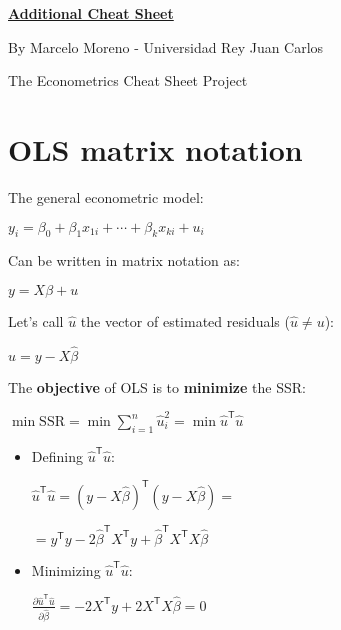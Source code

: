 \documentclass[10pt, a4paper, landscape]{extarticle}
\newcommand{\SSR}{\mathrm{SSR}}
\newcommand{\tr}{\mathsf{T}}
\begin{document}
\setlength{\footskip}{12pt}

\begin{multicols}{3}

\begin{center}
	\textbf{\LARGE \href{https://github.com/marcelomijas/econometrics-cheatsheet}{Additional Cheat Sheet}}
	
	{\footnotesize By Marcelo Moreno - Universidad Rey Juan Carlos}
	
	{\footnotesize The Econometrics Cheat Sheet Project}
\end{center}

\section*{OLS matrix notation}

The general econometric model:

\begin{center}
	$y_i = \beta_0 + \beta_1 x_{1i} + \cdots + \beta_k x_{ki} + u_i$
\end{center}

Can be written in matrix notation as:

\begin{center}
	$y = X \beta + u$
\end{center}

Let's call $\hat{u}$ the vector of estimated residuals ($\hat{u} \neq u$):

\begin{center}
	$\hat{u} = y - X \hat{\beta}$
\end{center}

The \textbf{objective} of OLS is to \textbf{minimize} the SSR:

\begin{center}
	$\min \SSR = \min \sum_{i=1}^n \hat{u}_i^2 = \min \hat{u}^\tr \hat{u}$
\end{center}

\begin{itemize}[leftmargin=*]
	\item Defining $\hat{u}^\tr \hat{u}$:
	\begin{center}
		$\hat{u}^\tr \hat{u} = (y - X \hat{\beta})^\tr (y - X \hat{\beta}) =$

		$= y^\tr y -2 \hat{\beta}^\tr X^\tr y + \hat{\beta}^\tr X^\tr X \hat{\beta}$
	\end{center}
	\item Minimizing $\hat{u}^\tr \hat{u}$:
	\begin{center}
		$\frac{\partial \hat{u}^\tr \hat{u}}{\partial \hat{\beta}} = -2 X^\tr y + 2 X^\tr X \hat{\beta} = 0$


\end{center}
\end{itemize}
\end{multicols}
\end{document}
